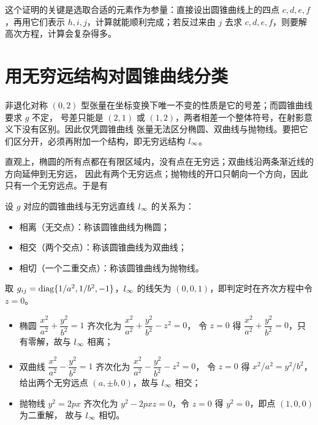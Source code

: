 \begin{remark}
这个证明的关键是选取合适的元素作为参量：直接设出圆锥曲线上的四点 $c,d,e,f$，再用它们表示
$h,i,j$，计算就能顺利完成；若反过来由 $j$ 去求 $c,d,e,f$，则要解高次方程，计算会复杂得多。
\end{remark}

\section{用无穷远结构对圆锥曲线分类}

非退化对称 $(0,2)$ 型张量在坐标变换下唯一不变的性质是它的号差；而圆锥曲线要求 $g$ 不定，
号差只能是 $(2,1)$ 或 $(1,2)$，两者相差一个整体符号，在射影意义下没有区别。因此仅凭圆锥曲线
张量无法区分椭圆、双曲线与抛物线。要把它们区分开，必须再附加一个结构，即无穷远结构 $l_{\infty}$。

直观上，椭圆的所有点都在有限区域内，没有点在无穷远；双曲线沿两条渐近线的方向延伸到无穷远，
因此有两个无穷远点；抛物线的开口只朝向一个方向，因此只有一个无穷远点。于是有

\begin{definition}
设 $g$ 对应的圆锥曲线与无穷远直线 $l_{\infty}$ 的关系为：
\begin{itemize}
\item 相离（无交点）：称该圆锥曲线为椭圆；
\item 相交（两个交点）：称该圆锥曲线为双曲线；
\item 相切（一个二重交点）：称该圆锥曲线为抛物线。
\end{itemize}
\end{definition}

\begin{example}[解析判定]
取 $g_{ij}=\operatorname{diag}\{1/a^2,1/b^2,-1\}$，$l_{\infty}$ 的线矢为 $(0,0,1)$，即判定时在齐次方程中令 $z=0$。
\begin{itemize}
\item 椭圆 $\dfrac{x^2}{a^2}+\dfrac{y^2}{b^2}=1$ 齐次化为 $\dfrac{x^2}{a^2}+\dfrac{y^2}{b^2}-z^2=0$，
令 $z=0$ 得 $\dfrac{x^2}{a^2}+\dfrac{y^2}{b^2}=0$，只有零解，故与 $l_{\infty}$ 相离；
\item 双曲线 $\dfrac{x^2}{a^2}-\dfrac{y^2}{b^2}=1$ 齐次化为 $\dfrac{x^2}{a^2}-\dfrac{y^2}{b^2}-z^2=0$，
令 $z=0$ 得 $x^2/a^2=y^2/b^2$，给出两个无穷远点 $(a,\pm b,0)$，故与 $l_{\infty}$ 相交；
\item 抛物线 $y^2=2px$ 齐次化为 $y^2-2pxz=0$，令 $z=0$ 得 $y^2=0$，即点 $(1,0,0)$ 为二重解，
故与 $l_{\infty}$ 相切。
\end{itemize}
\end{example}

